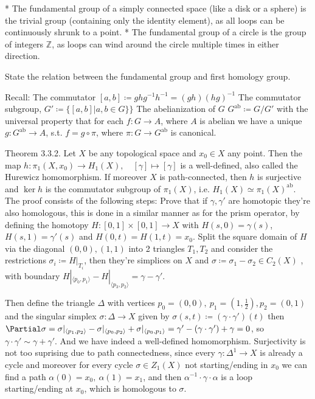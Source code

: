 * The fundamental group of a simply connected space (like a disk or a sphere) is the trivial group (containing only the identity element), as all loops can be continuously shrunk to a point.
* The fundamental group of a circle is the group of integers \(\mathbb{Z}\), as loops can wind around the circle multiple times in either direction. 

State the relation between the fundamental group and first homology group.

Recall: 
The commutator \( [a, b] \coloneqq  ghg^{-1}h^{-1} = (gh)(hg)^{-1}\) 
The commutator subgroup,
\( G' \coloneqq \{ [a, b] | a, b \in G \}\}\)
The abelianization of \( G \)
\( G^{\text{ab}} \coloneqq G/G' \)
with the universal property that for each \( f : G \to A \), where \( A \) is abelian we have a unique \( g : G^{\text{ab}} \to A \),
s.t. \( f = g \circ \pi \), where \( \pi : G \to G^{\text{ab}} \) is canonical.

Theorem 3.3.2. Let \(X\) be any topological space and \(x_0 \in X\) any point. Then the map
\(h: \pi_1(X, x_0) \to H_1(X), \quad [\gamma] \mapsto [\gamma]\)
is a well-defined, also called the Hurewicz homomorphism. 
If moreover \(X\) is path-connected, then \(h\) is surjective and \(\ker h\) is the commutator subgroup of \(\pi_1(X)\), i.e. \(H_1(X) \simeq \pi_1(X)^{\text{ab}}\).
The proof consists of the following steps:
Prove that if \( \gamma, \gamma' \) are homotopic they're also homologous, this is done in a similar manner as for the prism operator,
by defining the homotopy \( H : [0, 1] \times [0, 1] \to X \) with \( H(s, 0) = \gamma(s) \), \( H(s, 1) = \gamma'(s) \)
and \( H(0, t) = H(1, t) = x_0 \). Split the square domain of \( H \) via the diagonal \( (0, 0), (1, 1) \) into 2 triangles \( T_1, T_{2}\) and consider the restrictions
\( \sigma_i \coloneqq H|_{T_{i}} \), then they're simplices on \( X \) and \( \sigma \coloneqq \sigma_{1} - \sigma_{2} \in C_{2}(X)\) , with boundary
\( H|_{\langle p_0, p_1 \rangle} - H|_{\langle p_3, p_2 \rangle} = \gamma - \gamma'\).

Then define the triangle \( \Delta \) with vertices \( p_0 = (0, 0),\ p_{1} = (1, \frac{1}{2}), p_2 = (0, 1) \) and the singular simplex \( \sigma : \Delta \to X\)
given by \( \sigma(s, t) \coloneqq (\gamma \cdot \gamma')(t) \) then \( \Partial \sigma = \sigma|_{\langle p_1, p_2 \rangle} - \sigma|_{\langle p_0, p_2 \rangle} + \sigma|_{\langle p_0, p_1 \rangle} = \gamma' - (\gamma \cdot \gamma') + \gamma = 0\), so \( \gamma \cdot \gamma' \sim \gamma + \gamma' \).
And we have indeed a well-defined homomorphism.
Surjectivity is not too suprising due to path connectedness, since every \( \gamma : \Delta^1 \to X \) is already a cycle and moreover
for every cycle \( \sigma \in Z_1(X) \) not starting/ending in \( x_0 \) we can find a path \( \alpha(0) = x_0,\ \alpha(1) = x_1 \),
and then \( \alpha^{-1} \cdot \gamma \cdot \alpha \) is a loop starting/ending at \( x_0 \), which is homologous to \( \sigma \).

